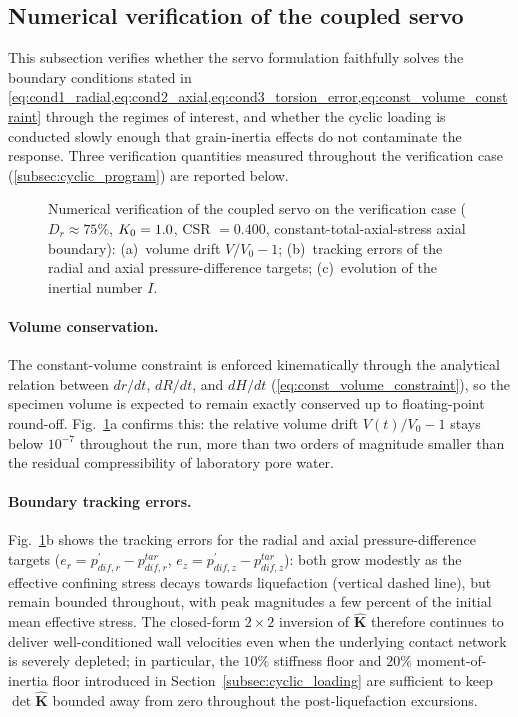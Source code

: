 \FloatBarrier

\subsection{Numerical verification of the coupled servo}
\label{subsec:numerical_verification}

This subsection verifies whether the servo formulation faithfully solves the boundary conditions stated in \cref{eq:cond1_radial,eq:cond2_axial,eq:cond3_torsion_error,eq:const_volume_constraint} through the regimes of interest, and whether the cyclic loading is conducted slowly enough that grain-inertia effects do not contaminate the response. Three verification quantities measured throughout the verification case (\cref{subsec:cyclic_program}) are reported below.

\begin{figure}
  \centering
  \caption{Numerical verification of the coupled servo on the verification case ($D_r \approx 75\%$, $K_0{} = 1.0$, CSR $= 0.400$, constant-total-axial-stress axial boundary): (a)~volume drift $V/V_0 - 1$; (b)~tracking errors of the radial and axial pressure-difference targets; (c)~evolution of the inertial number $I$.}
  \label{fig:numerical_verification}
\end{figure}

\paragraph{Volume conservation.}
The constant-volume constraint is enforced kinematically through the analytical relation between $dr/dt$, $dR/dt$, and $dH/dt$ (\cref{eq:const_volume_constraint}), so the specimen volume is expected to remain exactly conserved up to floating-point round-off. Fig.~\ref{fig:numerical_verification}a confirms this: the relative volume drift $V(t)/V_0 - 1$ stays below $10^{-7}$ throughout the run, more than two orders of magnitude smaller than the residual compressibility of laboratory pore water.

\paragraph{Boundary tracking errors.}
Fig.~\ref{fig:numerical_verification}b shows the tracking errors for the radial and axial pressure-difference targets ($e_r = p_{dif,r}^{\prime} - p_{dif,r}^{tar}$, $e_z = p_{dif,z}^{\prime} - p_{dif,z}^{tar}$): both grow modestly as the effective confining stress decays towards liquefaction (vertical dashed line), but remain bounded throughout, with peak magnitudes a few percent of the initial mean effective stress. The closed-form $2 \times 2$ inversion of $\hat{\mathbf{K}}$ therefore continues to deliver well-conditioned wall velocities even when the underlying contact network is severely depleted; in particular, the $10\%$ stiffness floor and $20\%$ moment-of-inertia floor introduced in Section~\ref{subsec:cyclic_loading} are sufficient to keep $\det\hat{\mathbf{K}}$ bounded away from zero throughout the post-liquefaction excursions.

